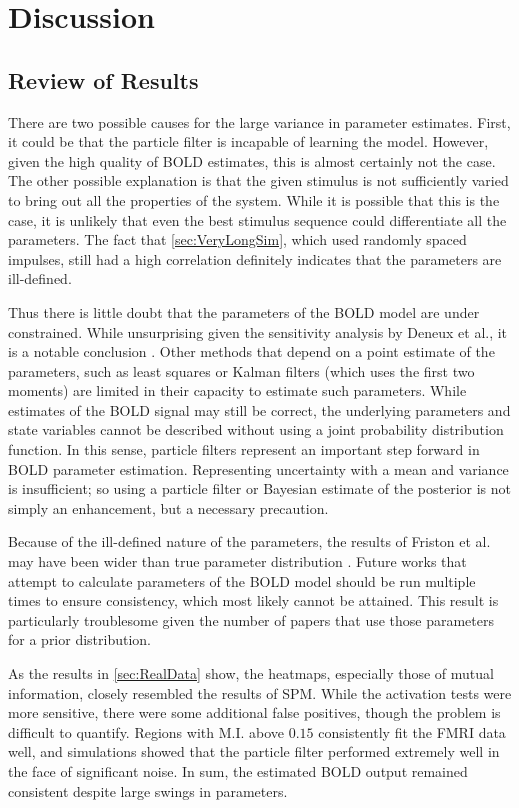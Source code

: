 \chapter{Discussion}
\label{sec:Discussion}
\section{Review of Results}
There are two possible causes for the large variance in
parameter estimates. First, it could be that the particle filter is
incapable of learning the model. However, given the high quality
of BOLD estimates, this is almost certainly not the case. The other 
possible explanation is that the given stimulus is not sufficiently
varied to bring out all the properties of the system. While it is 
possible that this is the case, it is unlikely that even the best 
stimulus sequence could differentiate all the parameters. The fact
that \autoref{sec:VeryLongSim}, which used randomly spaced impulses,
still had a high correlation definitely indicates that the parameters
are ill-defined. 

Thus there is little doubt that the parameters of the BOLD model are under
constrained. While unsurprising given the sensitivity analysis by Deneux et al.,
it is a notable conclusion \cite{Deneux2006}. Other methods
that depend on a point estimate of the parameters, such as least squares 
or Kalman filters (which uses the first two moments) are limited in their
capacity to estimate such parameters. While estimates of
the  BOLD signal may still be correct, the 
underlying parameters and state variables cannot be described without using
a joint probability distribution function. In this sense, particle 
filters represent an important step forward in BOLD parameter 
estimation. Representing uncertainty with a mean
and variance is insufficient; so using a particle filter
or Bayesian estimate of the posterior is not simply an enhancement, 
but a necessary precaution.

Because of the ill-defined nature of the parameters, the results 
of Friston et al. may have been wider than true parameter distribution
\cite{Friston2002}. Future works that attempt to calculate parameters
of the BOLD model should be run multiple times to ensure consistency,
which most likely cannot be attained. This result is particularly
troublesome given the number of papers that use those parameters for
a prior distribution.

As the results in \autoref{sec:RealData} show, the heatmaps, especially
those of mutual information, closely resembled the results of SPM. While the activation
tests were more sensitive, there were some additional false positives, 
though the problem is difficult to quantify. Regions with M.I. above 
$0.15$ consistently fit the FMRI data well, and simulations showed that
the particle filter performed extremely well in the face of significant
noise. In sum, the estimated BOLD output remained consistent despite
large swings in parameters.

